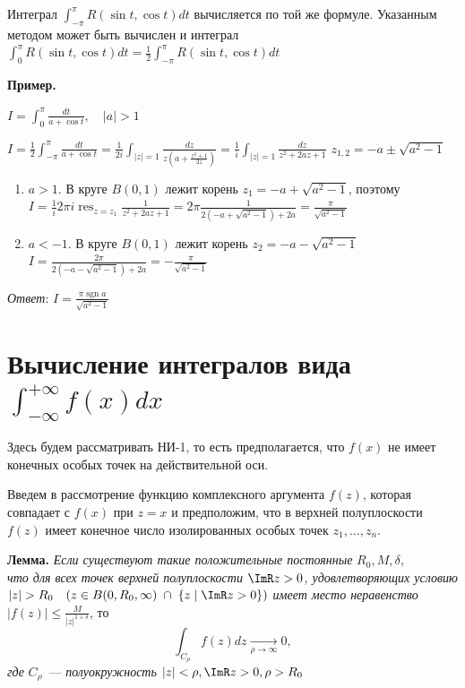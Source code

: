 \documentclass[a4paper, 12pt]{report}
\DeclareMathOperator*{\res}{res}
\DeclareMathOperator{\sgn}{sgn}
\begin{document}
\begin{remark}
    Интеграл $\displaystyle \int_{-\pi}^{\pi} R(\sin t, \cos t) dt$ вычисляется по той же формуле.
    Указанным методом может быть вычислен и интеграл $\displaystyle \int_0^{\pi} R(\sin t, \cos t) dt = \frac{1}{2} \int_{-\pi}^{\pi} R(\sin t, \cos t) dt$
\end{remark}
\par\bigskip
\textbf{Пример.} \par\bigskip
$\displaystyle I = \int_0^\pi \frac{dt}{a + \cos t}, \quad |a| > 1$ \par\bigskip
$\displaystyle I = \frac{1}{2} \int_{-\pi}^{\pi} \frac{dt}{a + \cos t} = \frac{1}{2i} \int_{|z|=1} \frac{dz}{z \left( a + \frac{z^2 + 1}{2z} \right)} = \frac{1}{i} \int_{|z|=1} \frac{dz}{z^2+2az+1}$
$\displaystyle z_{1,2}=-a \pm \sqrt{a^2-1}$ \\
\begin{enumerate}
    \item $a > 1$. В круге $B(0,1)$ лежит корень $z_1 = -a+\sqrt{a^2-1}$, поэтому \\
        $\displaystyle I = \frac{1}{i}2\pi i \res_{z=z_1}{\frac{1}{z^2+2az+1}} = 2 \pi \frac{1}{2\left(-a+\sqrt{a^2-1}\right) +2a} = \frac{\pi}{\sqrt{a^2-1}}$
    \item $a<-1$. В круге $B(0,1)$ лежит корень $z_2 = -a-\sqrt{a^2-1}$ \\
        $\displaystyle I = \frac{2\pi}{2\left(-a-\sqrt{a^2-1}\right) +2a} = -\frac{\pi}{\sqrt{a^2-1}}$
\end{enumerate}
\par
\textit{Ответ}: $\displaystyle I = \frac{\pi \sgn a}{\sqrt{a^2-1}}$





\section{Вычисление интегралов вида $\displaystyle \int_{-\infty}^{+\infty}f(x) dx$}
Здесь будем рассматривать НИ-1, то есть предполагается, что $f(x)$ не имеет конечных особых точек на действительной оси.

Введем в рассмотрение функцию комплексного аргумента $f(z)$, которая совпадает с $f(x)$ при $z=x$ 
и предположим, что в верхней полуплоскости $f(z)$ имеет конечное число изолированных особых точек $z_1,\dotsc,z_n$.

\textbf{Лемма.} \quad
    \textit{Если существуют такие положительные постоянные} $R_0, M, \delta$\textit{,\\ что для всех точек верхней полуплоскости} $\ImR z>0$\textit{,
    удовлетворяющих условию} \\$\displaystyle |z|>R_0 \quad (z\in B(0, R_0, \infty)\;\cap\;\{z \;|\; \ImR z>0\})$ \textit{имеет место неравенство}
    $\displaystyle |f(z)| \leqslant \frac{M}{|z|^{1+\delta}}$, то
    \begin{equation} \label{lemma:1}
        \int_{C_\rho} f(z)dz \xrightarrow[\rho \to \infty]{} 0,
    \end{equation}
    \textit{где} $ C_\rho $~--- \textit{полуокружность} $|z|<\rho, \ImR z>0, \rho>R_0$
\end{document}
